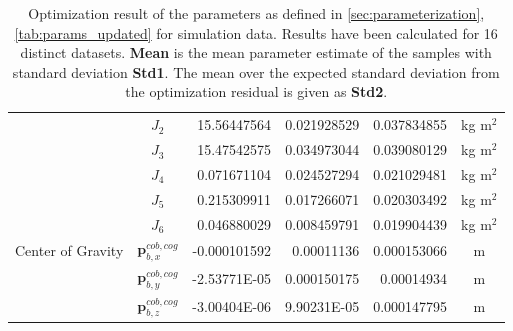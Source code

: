 \begin{table}[H]
\begin{tabular}{lcrrrc}
               & $J_2$ & 15.56447564 & 0.021928529 & 0.037834855 & kg m$^2$ \\
               & $J_3$ & 15.47542575 & 0.034973044 & 0.039080129 & kg m$^2$ \\
               & $J_4$ & 0.071671104 & 0.024527294 & 0.021029481 & kg m$^2$ \\
               & $J_5$ & 0.215309911 & 0.017266071 & 0.020303492 & kg m$^2$ \\
               & $J_6$ & 0.046880029 & 0.008459791 & 0.019904439 & kg m$^2$ \\
\hline
Center of Gravity & $\mathbf{p}_{b,x}^{cob,cog}$ & -0.000101592 & 0.00011136 & 0.000153066 & m \\
                  & $\mathbf{p}_{b,y}^{cob,cog}$ & -2.53771E-05 & 0.000150175 & 0.00014934 & m \\
                  & $\mathbf{p}_{b,z}^{cob,cog}$ & -3.00404E-06 & 9.90231E-05 & 0.000147795 & m \\
\hline
\end{tabular}
\caption{Optimization result of the parameters as defined in \cref{sec:parameterization}, \cref{tab:params_updated} for simulation data. Results have been calculated for 16 distinct datasets. \textbf{Mean} is the mean parameter estimate of the samples with standard deviation \textbf{Std1}. The mean over the expected standard deviation from the optimization residual is given as \textbf{Std2}.}
\end{table}

